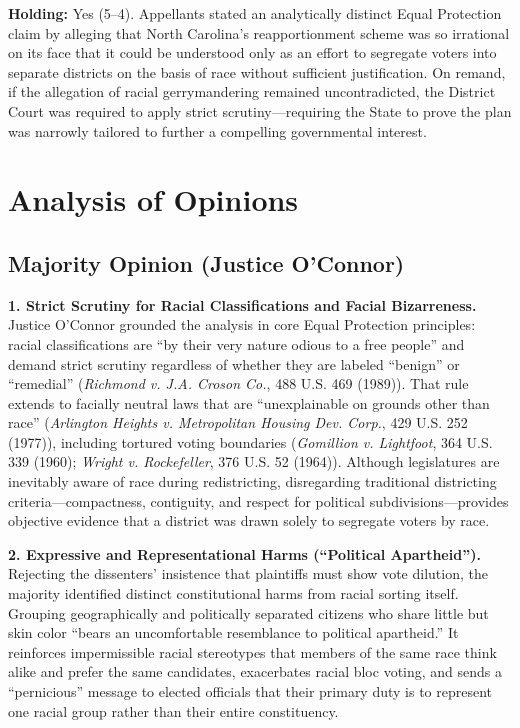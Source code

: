 \documentclass[12pt]{article}
\begin{document}
\textbf{Holding:} Yes (5--4). Appellants stated an analytically distinct Equal Protection claim by alleging that North Carolina's reapportionment scheme was so irrational on its face that it could be understood only as an effort to segregate voters into separate districts on the basis of race without sufficient justification. On remand, if the allegation of racial gerrymandering remained uncontradicted, the District Court was required to apply strict scrutiny---requiring the State to prove the plan was narrowly tailored to further a compelling governmental interest.

\section{Analysis of Opinions}
\subsection{Majority Opinion (Justice O'Connor)}

\textbf{1. Strict Scrutiny for Racial Classifications and Facial Bizarreness.} Justice O'Connor grounded the analysis in core Equal Protection principles: racial classifications are ``by their very nature odious to a free people'' and demand strict scrutiny regardless of whether they are labeled ``benign'' or ``remedial'' (\textit{Richmond v. J.A. Croson Co.}, 488 U.S. 469 (1989)). That rule extends to facially neutral laws that are ``unexplainable on grounds other than race'' (\textit{Arlington Heights v. Metropolitan Housing Dev. Corp.}, 429 U.S. 252 (1977)), including tortured voting boundaries (\textit{Gomillion v. Lightfoot}, 364 U.S. 339 (1960); \textit{Wright v. Rockefeller}, 376 U.S. 52 (1964)). Although legislatures are inevitably aware of race during redistricting, disregarding traditional districting criteria---compactness, contiguity, and respect for political subdivisions---provides objective evidence that a district was drawn solely to segregate voters by race.

\textbf{2. Expressive and Representational Harms (``Political Apartheid'').} Rejecting the dissenters' insistence that plaintiffs must show vote dilution, the majority identified distinct constitutional harms from racial sorting itself. Grouping geographically and politically separated citizens who share little but skin color ``bears an uncomfortable resemblance to political apartheid.'' It reinforces impermissible racial stereotypes that members of the same race think alike and prefer the same candidates, exacerbates racial bloc voting, and sends a ``pernicious'' message to elected officials that their primary duty is to represent one racial group rather than their entire constituency.
\end{document}
